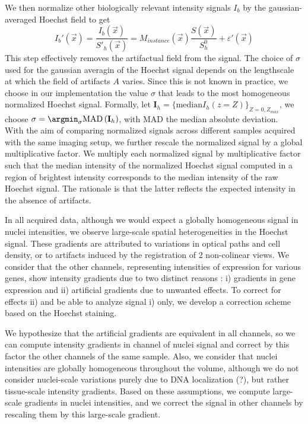 We then normalize other biologically relevant intensity signals $I_b$ by the gaussian-averaged Hoechst field to get
\begin{equation}
    I_b'(\vec{x}) = \frac{I_b(\vec{x})}{S'_{h}(\vec{x})} = M_{instance}(\vec{x}) \frac{S(\vec{x})}{S_h^0} + \varepsilon'(\vec{x})
\end{equation}
This step effectively removes the artifactual field from the signal.
The choice of $\sigma$ used for the gaussian averagin of the Hoechst signal depends on the lengthscale at which the field of artifacts $A$ varies. 
Since this is not known in practice, we choose in our implementation the value $\sigma$ that leads to the most homogeneous normalized Hoechst signal. 
Formally, let $\mathbf{I}_{h} = \{ \text{median} I_{h}(z=Z) \}_{Z=0, Z_{max}}$, we choose $\sigma = \argmin_\sigma \text{MAD} \left( \mathbf{I}_{h} \right)$, with $\text{MAD}$ the median absolute deviation.\\

With the aim of comparing normalized signals across different samples acquired with the same imaging setup, we further rescale the normalized signal by a global multiplicative factor.
We multiply each normalized signal by multiplicative factor such that the median intensity of the normalized Hoechst signal computed in a region of brightest intensity corresponds to the median intensity of the raw Hoechst signal.
The rationale is that the latter reflects the expected intensity in the absence of artifacts.





In all acquired data, although we would expect a globally homogeneous signal in nuclei intensities, we observe large-scale spatial heterogeneities in the Hoechst signal. These gradients are attributed to variations in optical paths and cell density, or to artifacts induced by the registration of 2 non-colinear views. We consider that the other channels, representing intensities of expression for various genes, show intensity gradients due to two distinct reasons : i) gradients in gene expression and ii) artificial gradients due to unwanted effects. 
To correct for effects ii) and be able to analyze signal i) only, we develop a correction scheme based on the Hoechst staining.






We hypothesize that the artificial gradients are equivalent in all channels, so we can compute intensity gradients in channel of nuclei signal and correct by this factor the other channels of the same sample.
Also, we consider that nuclei intensities are globally homogeneous throughout the volume, although we do not consider nuclei-scale variations purely due to DNA localization (?), but rather tissue-scale intensity gradients. Based on these assumptions, we compute large-scale gradients in nuclei intensities, and we correct the signal in other channels by rescaling them by this large-scale gradient.

